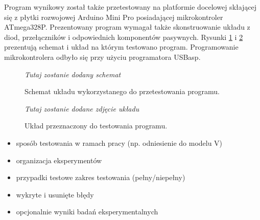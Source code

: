 Program wynikowy został także przetestowany na platformie docelowej skłającej się z płytki rozwojowej Arduino Mini Pro posiadającej mikrokontroler ATmega328P. Prezentowany program wymagał także skonstruowanie układu z diod, przełączników i odpowiednich komponentów pasywnych. Rysunki \ref{fig:schematic} i \ref{fig:electronics} prezentują schemat i układ na którym testowano program. Programowanie mikrokontrolera odbyło się przy użyciu programatora USBasp.

\begin{figure}
	\textit{Tutaj zostanie dodany schemat}
	\caption{Schemat układu wykorzystanego do przetestowania programu.}
	\label{fig:schematic}
\end{figure}

\begin{figure}
	\textit{Tutaj zostanie dodane zdjęcie układu}
	\caption{Układ przeznaczony do testowania programu.}
	\label{fig:electronics}
\end{figure}

\begin{itemize}
\item sposób testowania w ramach pracy (np. odniesienie do modelu V)
\item organizacja eksperymentów
\item przypadki testowe zakres testowania (pełny/niepełny)
\item wykryte i usunięte błędy
\item opcjonalnie wyniki badań eksperymentalnych
\end{itemize}

